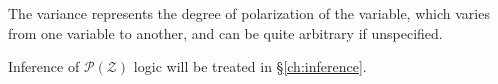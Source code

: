 The variance represents the degree of polarization of the variable, which varies from one variable to another, and can be quite arbitrary if unspecified.


Inference of $\mathcal{P(Z)}$ logic will be treated in \S\ref{ch:inference}.

%

%
%




